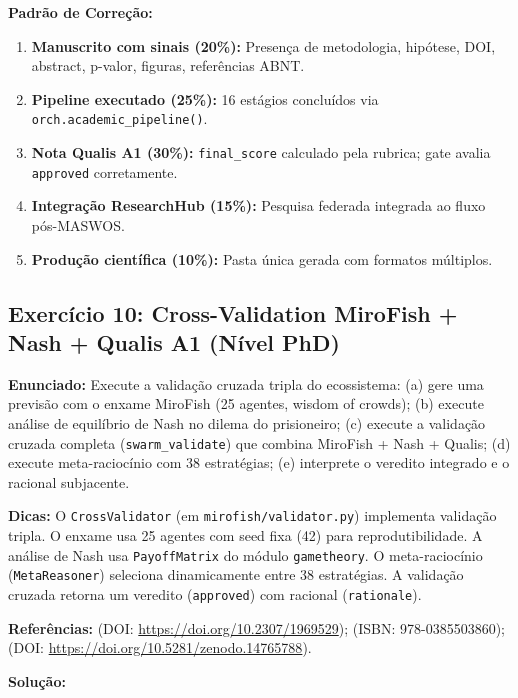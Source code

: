 \textbf{Padrão de Correção:}
\begin{enumerate}
  \item \textbf{Manuscrito com sinais (20\%):} Presença de metodologia, hipótese, DOI, abstract, p-valor, figuras, referências ABNT.
  \item \textbf{Pipeline executado (25\%):} 16 estágios concluídos via \texttt{orch.academic\_pipeline()}.
  \item \textbf{Nota Qualis A1 (30\%):} \texttt{final\_score} calculado pela rubrica; gate avalia \texttt{approved} corretamente.
  \item \textbf{Integração ResearchHub (15\%):} Pesquisa federada integrada ao fluxo pós-MASWOS.
  \item \textbf{Produção científica (10\%):} Pasta única gerada com formatos múltiplos.
\end{enumerate}

\subsection{Exercício 10: Cross-Validation MiroFish + Nash + Qualis A1 (Nível PhD)}
\label{sec:ex10}

\textbf{Enunciado:} Execute a validação cruzada tripla do ecossistema: (a) gere uma previsão com o enxame MiroFish (25 agentes, wisdom of crowds); (b) execute análise de equilíbrio de Nash no dilema do prisioneiro; (c) execute a validação cruzada completa (\texttt{swarm\_validate}) que combina MiroFish + Nash + Qualis; (d) execute meta-raciocínio com 38 estratégias; (e) interprete o veredito integrado e o racional subjacente.

\textbf{Dicas:} O \texttt{CrossValidator} (em \texttt{mirofish/validator.py}) implementa validação tripla. O enxame usa 25 agentes com seed fixa (42) para reprodutibilidade. A análise de Nash usa \texttt{PayoffMatrix} do módulo \texttt{gametheory}. O meta-raciocínio (\texttt{MetaReasoner}) seleciona dinamicamente entre 38 estratégias. A validação cruzada retorna um veredito (\texttt{approved}) com racional (\texttt{rationale}).

\textbf{Referências:} \citet{nash1951noncooperative} (DOI: \url{https://doi.org/10.2307/1969529}); \citet{surowiecki2004wisdom} (ISBN: 978-0385503860); \citet{claro2025mirofish} (DOI: \url{https://doi.org/10.5281/zenodo.14765788}).

\textbf{Solução:}

